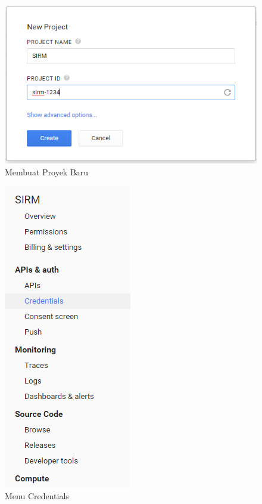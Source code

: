 \begin{figure}[H]
\centering
\includegraphics[scale=1]{Gambar/newproject.png}
\caption[Membuat Proyek Baru]{Membuat Proyek Baru} 
\label{fig:newproject}
\end{figure}

\begin{figure}[H]
\centering
\includegraphics[scale=1]{Gambar/credentials.png}
\caption[Menu Credentials]{Menu Credentials} 
\label{fig:credentials}
\end{figure}

